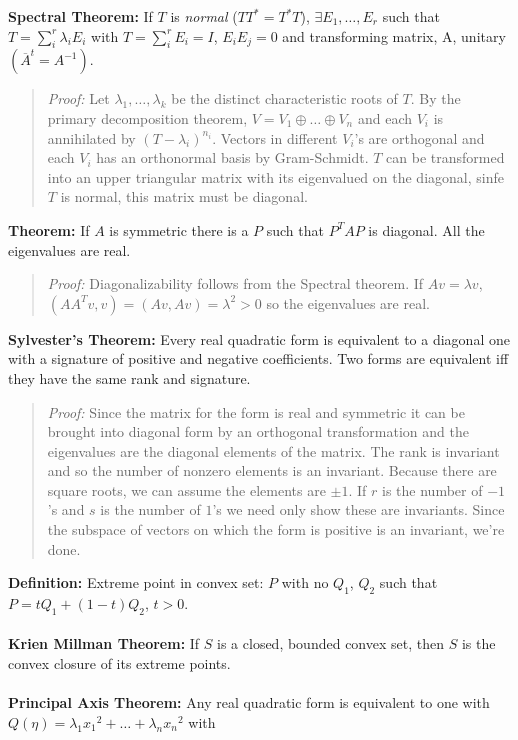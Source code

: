 {\bf Spectral Theorem:}  If $T$ is \emph{normal} ($TT^*=T^*T$), $\exists E_{1}, 
\ldots , E_{r}$ such that $T= \sum_{i}^{r} \lambda_{i} E_{i}$ with
$T= \sum_{i}^{r} E_{i}= I$, $E_{i}E_{j}= 0$ and transforming matrix, A,
unitary $({\overline A^{t}} = A^{-1})$.
\begin{quote}
\emph{Proof:} 
Let $\lambda_1, \ldots, \lambda_k$ be the distinct characteristic roots of $T$.  By
the primary decomposition theorem, $V= V_1 \oplus \ldots \oplus V_n$
and each $V_i$ is annihilated by $(T-\lambda_i)^{n_i}$.  Vectors
in different $V_i$'s are orthogonal and each $V_i$ has an orthonormal basis by Gram-Schmidt.
$T$ can be transformed into an upper triangular matrix with its eigenvalued on the diagonal,
sinfe $T$ is normal, this matrix must be diagonal.
\end{quote}
{\bf Theorem:}
If $A$ is symmetric there is a $P$ such that $P^TAP$ is diagonal.  All the 
eigenvalues are real.
\begin{quote}
\emph{Proof:} Diagonalizability follows from the Spectral theorem.  If
$Av= \lambda v$, $(AA^Tv, v)= (Av,Av)= \lambda^2>0$ so the eigenvalues are real.
\end{quote}
{\bf Sylvester's Theorem:}
Every real quadratic form is equivalent to a diagonal one
with a signature of positive and negative coefficients.   
Two forms are
equivalent iff they have the same rank and signature.
\begin{quote}
\emph{Proof:} 
Since the matrix for the form is real and symmetric it can be brought into diagonal form
by an orthogonal transformation and the eigenvalues are the diagonal elements of the
matrix.  The rank is invariant and so the number of nonzero elements is an invariant.
Because there are square roots, we can assume the elements are $\pm 1$.  If 
$r$ is the number of $-1$'s and 
$s$ is the number of $1$'s we need only show these are invariants.  Since the subspace
of vectors on which the form is positive is an invariant, we're done.
\end{quote}
{\bf Definition:}
Extreme point in {convex} set: $P$ with no $Q_1$, $Q_2$ such that $P= t Q_1 + (1-t) Q_2$,
$t>0$.
\\
\\
{\bf Krien Millman Theorem:}  
If $S$ is a closed, bounded convex set, then $S$ is the convex closure
of its extreme points.
\\
\\
{\bf Principal Axis Theorem:}
Any real quadratic form is equivalent to one with $Q(\eta)= \lambda_1{x_1}^2 +
\ldots + \lambda_n {x_n}^2$ with
